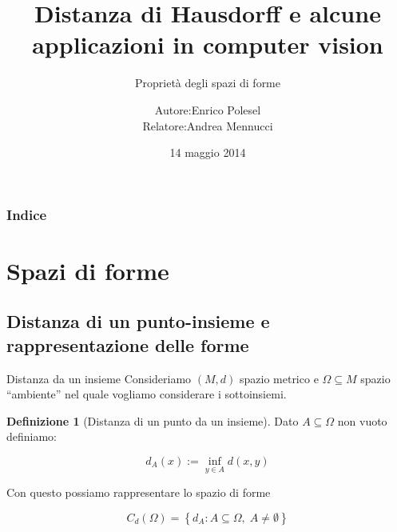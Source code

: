 \documentclass{beamer}
\newcounter{counter1}
\theoremstyle{plain}
\theoremstyle{definition}
\newtheorem{mydef}[counter1]{Definizione}
\theoremstyle{remark}
\newcommand{\set}[1]{\left\{#1\right\}}
\begin{document}
\title[Distanza di Hausdorff e applicazioni in computer
vision]{Distanza di Hausdorff e alcune applicazioni in computer
  vision}
\subtitle{Proprietà degli spazi di forme}
\date{14 maggio 2014}

\author[Enrico Polesel]{\begin{tabular}{r@{ }l}
Autore: &  Enrico Polesel \\ 
Relatore: & Andrea Mennucci
\end{tabular}
}



\begin{frame}[plain]
  \titlepage
\end{frame}

\begin{frame}[plain]
 \frametitle{Indice}
 \tableofcontents
\end{frame}




\AtBeginSubsection[]
{
  \begin{frame}[plain]{\secname $\rightarrow$ \subsecname}
    \tableofcontents[currentsubsection]
  \end{frame}
}

\section{Spazi di forme}

\subsection{Distanza di un punto-insieme e rappresentazione delle forme}


\begin{frame}{Distanza da un insieme}
  Consideriamo $(M,d)$ spazio metrico e $\Omega \subseteq M$ spazio
  ``ambiente'' nel quale vogliamo considerare i sottoinsiemi.
  
  \begin{mydef}[Distanza di un punto da un insieme]
    Dato $A \subseteq \Omega$ non vuoto definiamo:
    
    \[  d_A (x) := \inf _{y \in A} d(x,y) \] 
  \end{mydef}
  
  Con questo possiamo rappresentare lo spazio di forme
  
  \[ C_d(\Omega) = \set{d_A : A \subseteq \Omega,\; A \neq \emptyset} \]
\end{frame}
\end{document}
